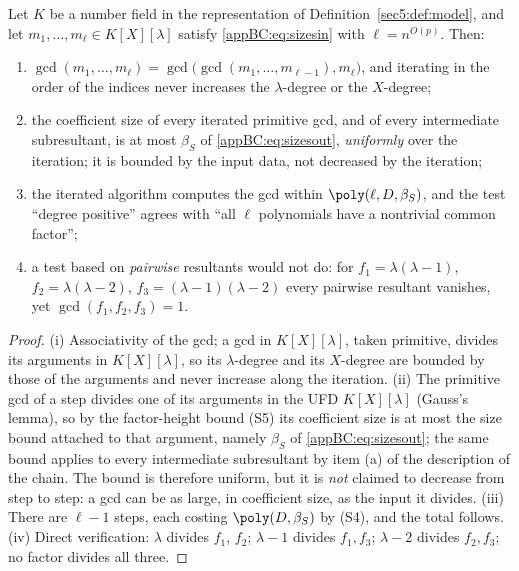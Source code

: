 \begin{prop}\label{appBC:prop:iter}\label{appBC:prop:cost}\label{appBC:rem:pairwise}
Let $K$ be a number field in the representation of Definition~\ref{sec5:def:model}, and let
$m_1,\dots,m_\ell\in K[X][\lambda]$ satisfy \eqref{appBC:eq:sizesin} with $\ell=n^{O(p)}$. Then:
\begin{enumerate}[label=(\roman*),leftmargin=*]
\item $\gcd(m_1,\dots,m_\ell)=\gcd\bigl(\gcd(m_1,\dots,m_{\ell-1}),m_\ell\bigr)$, and iterating in the
order of the indices never increases the $\lambda$-degree or the $X$-degree;
\item the coefficient size of every iterated primitive gcd, and of every intermediate subresultant, is
at most $\beta_S$ of \eqref{appBC:eq:sizesout}, \emph{uniformly} over the iteration; it is bounded by
the input data, not decreased by the iteration;
\item the iterated algorithm computes the gcd within $\poly(\ell,D,\beta_S)$, and the test ``degree
positive'' agrees with ``all $\ell$ polynomials have a nontrivial common factor'';
\item a test based on \emph{pairwise} resultants would not do: for $f_1=\lambda(\lambda-1)$,
$f_2=\lambda(\lambda-2)$, $f_3=(\lambda-1)(\lambda-2)$ every pairwise resultant vanishes, yet
$\gcd(f_1,f_2,f_3)=1$.
\end{enumerate}
\end{prop}

\begin{proof}
(i) Associativity of the gcd; a gcd in $K[X][\lambda]$, taken primitive, divides its arguments in
$K[X][\lambda]$, so its $\lambda$-degree and its $X$-degree are bounded by those of the arguments and
never increase along the iteration. (ii) The primitive gcd of a step divides one of its arguments in
the UFD $K[X][\lambda]$ (Gauss's lemma), so by the factor-height bound (S5) its coefficient size is at
most the size bound attached to that argument, namely $\beta_S$ of \eqref{appBC:eq:sizesout}; the same
bound applies to every intermediate subresultant by item (a) of the description of the chain. The bound
is therefore uniform, but it is \emph{not} claimed to decrease from step to step: a gcd can be as
large, in coefficient size, as the input it divides. (iii) There are $\ell-1$ steps, each costing
$\poly(D,\beta_S)$ by (S4), and the total follows. (iv) Direct verification: $\lambda$ divides $f_1$,
$f_2$; $\lambda-1$ divides $f_1,f_3$; $\lambda-2$ divides $f_2,f_3$; no factor divides all three.
\end{proof}

